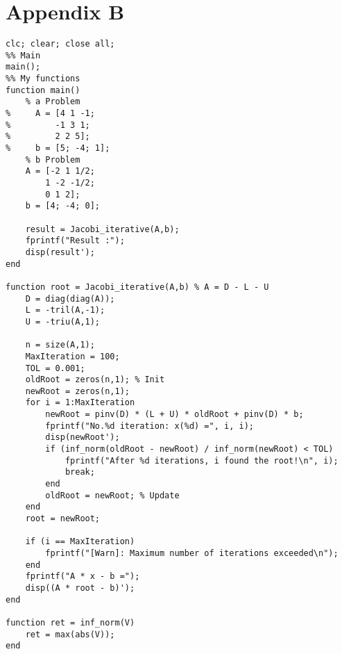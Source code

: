 \documentclass{article}
\begin{document}
\section{Appendix B}
\begin{lstlisting}
clc; clear; close all;
%% Main
main();
%% My functions
function main()
    % a Problem
%     A = [4 1 -1;
%         -1 3 1;
%         2 2 5];
%     b = [5; -4; 1];
    % b Problem
    A = [-2 1 1/2;
        1 -2 -1/2;
        0 1 2];
    b = [4; -4; 0];

    result = Jacobi_iterative(A,b);
    fprintf("Result :");
    disp(result');
end

function root = Jacobi_iterative(A,b) % A = D - L - U
    D = diag(diag(A));
    L = -tril(A,-1);
    U = -triu(A,1);
    
    n = size(A,1);
    MaxIteration = 100;
    TOL = 0.001;
    oldRoot = zeros(n,1); % Init
    newRoot = zeros(n,1);
    for i = 1:MaxIteration
        newRoot = pinv(D) * (L + U) * oldRoot + pinv(D) * b;
        fprintf("No.%d iteration: x(%d) =", i, i);
        disp(newRoot');
        if (inf_norm(oldRoot - newRoot) / inf_norm(newRoot) < TOL)
            fprintf("After %d iterations, i found the root!\n", i);
            break;
        end
        oldRoot = newRoot; % Update
    end
    root = newRoot;
    
    if (i == MaxIteration)
        fprintf("[Warn]: Maximum number of iterations exceeded\n");
    end
    fprintf("A * x - b =");
    disp((A * root - b)');
end

function ret = inf_norm(V)
    ret = max(abs(V));
end
\end{lstlisting}
\end{document}
